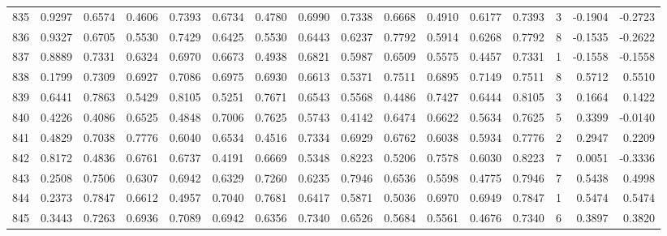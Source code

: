 \begin{tabular}{lrrrrrrrrrrrrrrr}
835 &      0.9297 &  0.6574 &  0.4606 &  0.7393 &  0.6734 &  0.4780 &  0.6990 &  0.7338 &  0.6668 &  0.4910 &   0.6177 &     0.7393 &      3 &                   -0.1904 &                    -0.2723 \\
836 &      0.9327 &  0.6705 &  0.5530 &  0.7429 &  0.6425 &  0.5530 &  0.6443 &  0.6237 &  0.7792 &  0.5914 &   0.6268 &     0.7792 &      8 &                   -0.1535 &                    -0.2622 \\
837 &      0.8889 &  0.7331 &  0.6324 &  0.6970 &  0.6673 &  0.4938 &  0.6821 &  0.5987 &  0.6509 &  0.5575 &   0.4457 &     0.7331 &      1 &                   -0.1558 &                    -0.1558 \\
838 &      0.1799 &  0.7309 &  0.6927 &  0.7086 &  0.6975 &  0.6930 &  0.6613 &  0.5371 &  0.7511 &  0.6895 &   0.7149 &     0.7511 &      8 &                    0.5712 &                     0.5510 \\
839 &      0.6441 &  0.7863 &  0.5429 &  0.8105 &  0.5251 &  0.7671 &  0.6543 &  0.5568 &  0.4486 &  0.7427 &   0.6444 &     0.8105 &      3 &                    0.1664 &                     0.1422 \\
840 &      0.4226 &  0.4086 &  0.6525 &  0.4848 &  0.7006 &  0.7625 &  0.5743 &  0.4142 &  0.6474 &  0.6622 &   0.5634 &     0.7625 &      5 &                    0.3399 &                    -0.0140 \\
841 &      0.4829 &  0.7038 &  0.7776 &  0.6040 &  0.6534 &  0.4516 &  0.7334 &  0.6929 &  0.6762 &  0.6038 &   0.5934 &     0.7776 &      2 &                    0.2947 &                     0.2209 \\
842 &      0.8172 &  0.4836 &  0.6761 &  0.6737 &  0.4191 &  0.6669 &  0.5348 &  0.8223 &  0.5206 &  0.7578 &   0.6030 &     0.8223 &      7 &                    0.0051 &                    -0.3336 \\
843 &      0.2508 &  0.7506 &  0.6307 &  0.6942 &  0.6329 &  0.7260 &  0.6235 &  0.7946 &  0.6536 &  0.5598 &   0.4775 &     0.7946 &      7 &                    0.5438 &                     0.4998 \\
844 &      0.2373 &  0.7847 &  0.6612 &  0.4957 &  0.7040 &  0.7681 &  0.6417 &  0.5871 &  0.5036 &  0.6970 &   0.6949 &     0.7847 &      1 &                    0.5474 &                     0.5474 \\
845 &      0.3443 &  0.7263 &  0.6936 &  0.7089 &  0.6942 &  0.6356 &  0.7340 &  0.6526 &  0.5684 &  0.5561 &   0.4676 &     0.7340 &      6 &                    0.3897 &                     0.3820 \\

\end{tabular}
